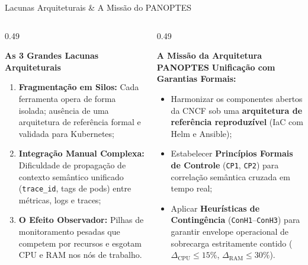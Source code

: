 \documentclass[aspectratio=169, 10pt]{beamer}
\begin{document}
\begin{frame}{Lacunas Arquiteturais \& A Missão do PANOPTES}
  \begin{columns}[T]
    \begin{column}{0.49\textwidth}
      \begin{alertblock}{\textbf{As 3 Grandes Lacunas Arquiteturais}}
        \small
        \begin{enumerate}
          \item \textbf{Fragmentação em Silos:} Cada ferramenta opera de forma isolada; ausência de uma arquitetura de referência formal e validada para Kubernetes;
          \vspace{0.5ex}
          \item \textbf{Integração Manual Complexa:} Dificuldade de propagação de contexto semântico unificado (\texttt{trace\_id}, tags de pods) entre métricas, logs e traces;
          \vspace{0.5ex}
          \item \textbf{O Efeito Observador:} Pilhas de monitoramento pesadas que competem por recursos e esgotam CPU e RAM nos nós de trabalho.
        \end{enumerate}
      \end{alertblock}
    \end{column}
    
    \begin{column}{0.49\textwidth}
      \begin{exampleblock}{\textbf{A Missão da Arquitetura PANOPTES}}
        \small
        \textbf{Unificação com Garantias Formais:}
        \begin{itemize}
          \item Harmonizar os componentes abertos da CNCF sob uma \textbf{arquitetura de referência reproduzível} (IaC com Helm e Ansible);
          \item Estabelecer \textbf{Princípios Formais de Controle} (\texttt{CP1}, \texttt{CP2}) para correlação semântica cruzada em tempo real;
          \item Aplicar \textbf{Heurísticas de Contingência} (\texttt{ConH1}--\texttt{ConH3}) para garantir envelope operacional de sobrecarga estritamente contido ($\Delta_{\text{CPU}} \le 15\%$, $\Delta_{\text{RAM}} \le 30\%$).
        \end{itemize}
      \end{exampleblock}
    \end{column}
  \end{columns}
\end{frame}
\end{document}
